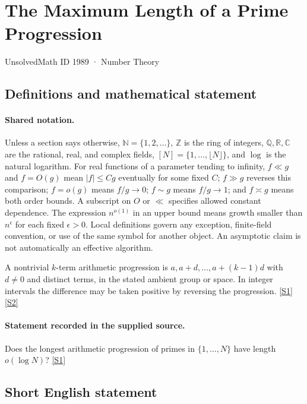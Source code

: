 \documentclass[11pt,a4paper]{article}
\newcommand{\N}{\mathbb{N}}
\newcommand{\Z}{\mathbb{Z}}
\newcommand{\Q}{\mathbb{Q}}
\newcommand{\R}{\mathbb{R}}
\newcommand{\C}{\mathbb{C}}
\newcommand{\sref}[2]{\hyperlink{source:#1:#2}{[S#2]}}
\begin{document}

\setcounter{section}{1988}

\section{The Maximum Length of a Prime Progression}\label{1989}

{\small\sffamily UnsolvedMath ID 1989 · Number Theory}

\subsection{Definitions and mathematical statement}

\paragraph{Shared notation.}Unless a section says otherwise, $\N=\{1,2,\ldots\}$,
$\Z$ is the ring of integers, $\Q,\R,\C$ are the rational, real, and complex
fields, $[N]=\{1,\ldots,\lfloor N\rfloor\}$, and $\log$ is the natural
logarithm. For real functions of a parameter tending to infinity,
$f\ll g$ and $f=O(g)$ mean $|f|\leq Cg$ eventually for some fixed $C$;
$f\gg g$ reverses this comparison; $f=o(g)$ means $f/g\to0$;
$f\sim g$ means $f/g\to1$; and $f\asymp g$ means both order bounds.
A subscript on $O$ or $\ll$ specifies allowed constant dependence.
The expression $n^{o(1)}$ in an upper bound means growth smaller than
$n^\epsilon$ for each fixed $\epsilon>0$. Local definitions govern any
exception, finite-field convention, or use of the same symbol for another
object. An asymptotic claim is not automatically an effective algorithm.



A nontrivial $k$-term arithmetic progression is $a,a+d,\ldots,a+(k-1)d$ with $d\ne0$ and distinct terms, in the stated ambient group or space. In integer intervals the difference may be taken positive by reversing the progression. \sref{1989}{1} \sref{1989}{2}

\paragraph{Statement recorded in the supplied source.}
Does the longest arithmetic progression of primes in $\{1,\ldots,N\}$ have length $o(\log N)$? \sref{1989}{1}

\subsection{Short English statement}
\end{document}
